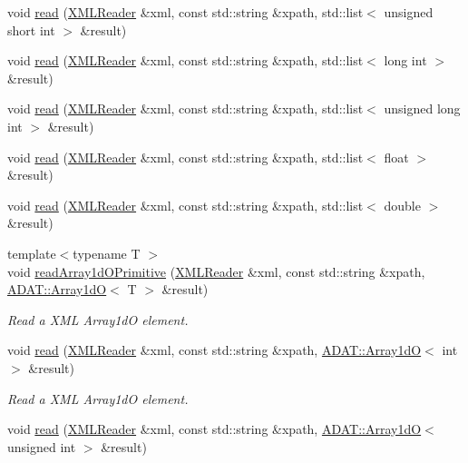 \begin{DoxyCompactItemize}
void \mbox{\hyperlink{group__io_ga6a4f6e0bca990676d09efaf318ed8eb7}{read}} (\mbox{\hyperlink{classADATXML_1_1XMLReader}{X\+M\+L\+Reader}} \&xml, const std\+::string \&xpath, std\+::list$<$ unsigned short int $>$ \&result)
\item 
void \mbox{\hyperlink{group__io_ga3369838beeb12ff807171fc5978df1be}{read}} (\mbox{\hyperlink{classADATXML_1_1XMLReader}{X\+M\+L\+Reader}} \&xml, const std\+::string \&xpath, std\+::list$<$ long int $>$ \&result)
\item 
void \mbox{\hyperlink{group__io_gae359122dfdc08b4e41d5d8f230426192}{read}} (\mbox{\hyperlink{classADATXML_1_1XMLReader}{X\+M\+L\+Reader}} \&xml, const std\+::string \&xpath, std\+::list$<$ unsigned long int $>$ \&result)
\item 
void \mbox{\hyperlink{group__io_ga1a4d06e4f08869c717ad7db1a8fbfa2f}{read}} (\mbox{\hyperlink{classADATXML_1_1XMLReader}{X\+M\+L\+Reader}} \&xml, const std\+::string \&xpath, std\+::list$<$ float $>$ \&result)
\item 
void \mbox{\hyperlink{group__io_ga8feeff4a74f8b53707756dc206808983}{read}} (\mbox{\hyperlink{classADATXML_1_1XMLReader}{X\+M\+L\+Reader}} \&xml, const std\+::string \&xpath, std\+::list$<$ double $>$ \&result)
\item 
{\footnotesize template$<$typename T $>$ }\\void \mbox{\hyperlink{namespaceADATXML_a0a1d6e8dcbf52e1413441824f0aa44e9}{read\+Array1d\+O\+Primitive}} (\mbox{\hyperlink{classADATXML_1_1XMLReader}{X\+M\+L\+Reader}} \&xml, const std\+::string \&xpath, \mbox{\hyperlink{classADAT_1_1Array1dO}{A\+D\+A\+T\+::\+Array1dO}}$<$ T $>$ \&result)
\begin{DoxyCompactList}\small\item\em Read a X\+ML Array1dO element. \end{DoxyCompactList}\item 
void \mbox{\hyperlink{group__io_ga1f304041cae2cc81ec6bd79e94a0f7dd}{read}} (\mbox{\hyperlink{classADATXML_1_1XMLReader}{X\+M\+L\+Reader}} \&xml, const std\+::string \&xpath, \mbox{\hyperlink{classADAT_1_1Array1dO}{A\+D\+A\+T\+::\+Array1dO}}$<$ int $>$ \&result)
\begin{DoxyCompactList}\small\item\em Read a X\+ML Array1dO element. \end{DoxyCompactList}\item 
void \mbox{\hyperlink{group__io_ga1c554d7ca96ef05f2e5c8d92af1515b9}{read}} (\mbox{\hyperlink{classADATXML_1_1XMLReader}{X\+M\+L\+Reader}} \&xml, const std\+::string \&xpath, \mbox{\hyperlink{classADAT_1_1Array1dO}{A\+D\+A\+T\+::\+Array1dO}}$<$ unsigned int $>$ \&result)

\end{DoxyCompactItemize}

